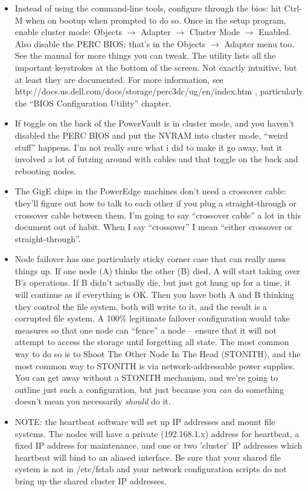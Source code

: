 \documentclass[11pt]{article}
\begin{document}
\begin{itemize}
\item Instead of using the command-line tools, configure through the
  bios: hit Ctrl-M when on bootup when prompted to do so.  Once in the
  setup program, enable cluster mode:
  Objects $\rightarrow$ Adapter $\rightarrow$ Cluster Mode $\rightarrow$
  Enabled.  Also disable the PERC BIOS: that's in the Objects
  $\rightarrow$ Adapter menu too.  See the manual for more things you
  can tweak.  The utility lists all the important keystrokes at the
  bottom of the screen.  Not exactly intuitive, but at least they are
  documented. For more information, see
  http://docs.us.dell.com/docs/storage/perc3dc/ug/en/index.htm ,
  particularly the ``BIOS Configuration Utility'' chapter.

\item If toggle on the back of the PowerVault is in cluster mode, and you
  haven't disabled the PERC BIOS and put the NVRAM into cluster mode,
  ``weird stuff'' happens.   I'm not really sure what i did to make it go
  away, but it involved a lot of futzing around with cables and that
  toggle on the back and rebooting nodes. 

\item The GigE chips in the PowerEdge machines don't need a crossover cable:
  they'll figure out how to talk to each other if you plug a
  straight-through or crossover cable between them.  I'm going to say
  ``crossover cable'' a lot in this document out of habit.  When I say
  ``crossover'' I mean ``either crossover or straight-through''.

\item Node failover has one particularly sticky corner case that can
  really mess things up.  If one node (A) thinks the other (B) died, A
  will start taking over B's operations.  If B didn't actually die, but
  just got hung up for a time, it will continue as if everything is OK.
  Then you have both A and B thinking they control the file system,
  both will write to it, and the result is a corrupted file system. A
  100\% legitimate failover configuration would take measures so that
  one node can ``fence'' a node -- ensure that it will not attempt to
  access the storage until forgetting all state.  The most common way to
  do so is to Shoot The Other Node In The Head (STONITH), and the most
  common way to STONITH is via network-addressable power supplies.  You
  can get away without a STONITH mechanism, and we're going to outline
  just such a configuration, but just because you { \em can} do something
  doesn't mean you necessarily {\em should} do it.  

\item NOTE: the heartbeat software will set up IP addresses and mount file
  systems.  The nodes will have a private (192.168.1.x) address for
  heartbeat, a fixed IP address for maintenance, and one or two
  'cluster' IP addresses which heartbeat will bind to an aliased
  interface.  Be sure that your shared file system is not in /etc/fstab
  and your network configuration scripts do not bring up the shared
  cluster IP addresses.  
\end{itemize}
\end{document}
